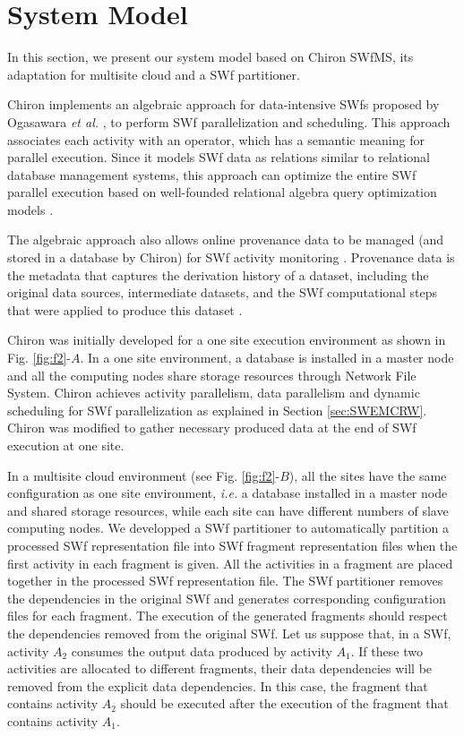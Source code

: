 \section{System Model}
\label{sec:SWEMCSM}
In this section, we present our system model based on Chiron SWfMS, its adaptation for multisite cloud and a SWf partitioner.

Chiron implements an algebraic approach for data-intensive SWfs proposed by Ogasawara \textit{et al.} \cite{Ogasawara2013}, to perform SWf parallelization and scheduling. This approach associates each activity with an operator, which has a semantic meaning for parallel execution.
Since it models SWf data as relations similar to relational database management systems, 
this approach can optimize the entire SWf parallel execution based on well-founded relational algebra query optimization models \cite{Ogasawara2011}.

The algebraic approach also allows online provenance data to be managed (and stored in a database by Chiron) for SWf activity monitoring \cite{Costa2013}. Provenance data is the metadata that captures the derivation history of a dataset, including the original data sources, intermediate datasets, and the SWf computational steps that were applied to produce this dataset \cite{Costa2013}.

Chiron was initially developed for a one site execution environment as shown in Fig. \ref{fig:f2}-$A$. 
In a one site environment, a database is installed in a master node
and all the computing nodes share storage resources through Network File System.
Chiron achieves activity parallelism, data parallelism and dynamic scheduling for SWf parallelization as explained in Section \ref{sec:SWEMCRW}.
Chiron was modified to gather necessary produced data at the end of SWf execution at one site.

In a multisite cloud environment (see Fig. \ref{fig:f2}-$B$), all the sites have the same configuration as one site environment, \textit{i.e.} a database installed in a master node and shared storage resources, while each site can have different numbers of slave computing nodes. We developped a SWf partitioner to automatically partition a processed SWf representation file into SWf fragment representation files
when the first activity in each fragment is given.
All the activities in a fragment are placed together in the processed SWf representation file.
The SWf partitioner removes the dependencies in the original SWf and generates corresponding configuration files for each fragment.
The execution of the generated fragments should respect the dependencies removed from the original SWf. 
Let us suppose that, in a SWf, activity \textit{$A_{2}$} consumes the output data produced by activity \textit{$A_{1}$}.
If these two activities are allocated to different fragments, 
their data dependencies will be removed from the explicit data dependencies. 
In this case, the fragment that contains activity \textit{$A_{2}$} should be executed after 
the execution of the fragment that contains activity \textit{$A_{1}$}. 

